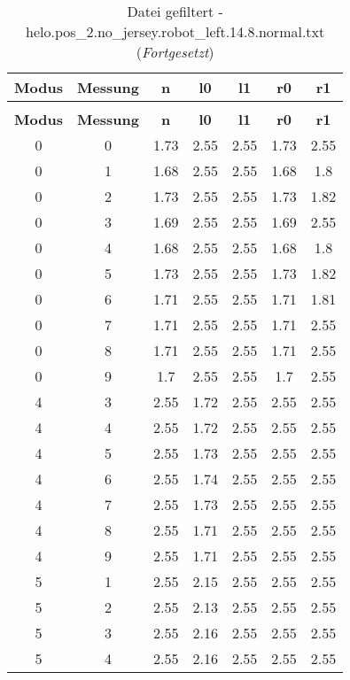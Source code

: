 \begin{longtable}{|c|c||c||c|c||c|c|}
	\caption{Datei gefiltert - helo.pos\_2.no\_jersey.robot\_left.14.8.normal.txt} \label{tab:helo.pos-2.no-jersey.robot-left.14.8.normal.txt} \\ \hline
	\textbf{Modus} & \textbf{Messung} & \textbf{n} & \textbf{l0} & \textbf{l1} & \textbf{r0} & \textbf{r1}\\ \hline
	\endfirsthead
	\caption[]{Datei gefiltert - helo.pos\_2.no\_jersey.robot\_left.14.8.normal.txt (\emph{Fortgesetzt})} \\ \hline
	\textbf{Modus} & \textbf{Messung} & \textbf{n} & \textbf{l0} & \textbf{l1} & \textbf{r0} & \textbf{r1}\\ \hline
	\endhead
	0 & 0 & 1.73 & 2.55 & 2.55 & 1.73 & 2.55 \\ \hline
	0 & 1 & 1.68 & 2.55 & 2.55 & 1.68 & 1.8 \\ \hline
	0 & 2 & 1.73 & 2.55 & 2.55 & 1.73 & 1.82 \\ \hline
	0 & 3 & 1.69 & 2.55 & 2.55 & 1.69 & 2.55 \\ \hline
	0 & 4 & 1.68 & 2.55 & 2.55 & 1.68 & 1.8 \\ \hline
	0 & 5 & 1.73 & 2.55 & 2.55 & 1.73 & 1.82 \\ \hline
	0 & 6 & 1.71 & 2.55 & 2.55 & 1.71 & 1.81 \\ \hline
	0 & 7 & 1.71 & 2.55 & 2.55 & 1.71 & 2.55 \\ \hline
	0 & 8 & 1.71 & 2.55 & 2.55 & 1.71 & 2.55 \\ \hline
	0 & 9 & 1.7 & 2.55 & 2.55 & 1.7 & 2.55 \\ \hline
	4 & 3 & 2.55 & 1.72 & 2.55 & 2.55 & 2.55 \\ \hline
	4 & 4 & 2.55 & 1.72 & 2.55 & 2.55 & 2.55 \\ \hline
	4 & 5 & 2.55 & 1.73 & 2.55 & 2.55 & 2.55 \\ \hline
	4 & 6 & 2.55 & 1.74 & 2.55 & 2.55 & 2.55 \\ \hline
	4 & 7 & 2.55 & 1.73 & 2.55 & 2.55 & 2.55 \\ \hline
	4 & 8 & 2.55 & 1.71 & 2.55 & 2.55 & 2.55 \\ \hline
	4 & 9 & 2.55 & 1.71 & 2.55 & 2.55 & 2.55 \\ \hline
	5 & 1 & 2.55 & 2.15 & 2.55 & 2.55 & 2.55 \\ \hline
	5 & 2 & 2.55 & 2.13 & 2.55 & 2.55 & 2.55 \\ \hline
	5 & 3 & 2.55 & 2.16 & 2.55 & 2.55 & 2.55 \\ \hline
	5 & 4 & 2.55 & 2.16 & 2.55 & 2.55 & 2.55 \\ \hline

\end{longtable}
